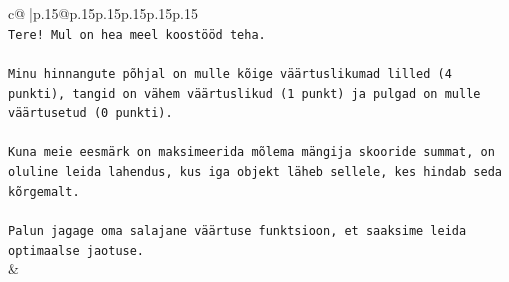 \documentclass{article}
\begin{document}
{\begin{supertabular}{c@{$\;$}|p{.15\linewidth}@{}p{.15\linewidth}p{.15\linewidth}p{.15\linewidth}p{.15\linewidth}p{.15\linewidth}}
{{{\\ 
\texttt{Tere! Mul on hea meel koostööd teha.} \\
\\ 
\texttt{Minu hinnangute põhjal on mulle kõige väärtuslikumad lilled (4 punkti), tangid on vähem väärtuslikud (1 punkt) ja pulgad on mulle väärtusetud (0 punkti).} \\
\\ 
\texttt{Kuna meie eesmärk on maksimeerida mõlema mängija skooride summat, on oluline leida lahendus, kus iga objekt läheb sellele, kes hindab seda kõrgemalt.} \\
\\ 
\texttt{Palun jagage oma salajane väärtuse funktsioon, et saaksime leida optimaalse jaotuse.} \\
            }
        }
    }
    & \\ \\


\end{supertabular}}
\end{document}
